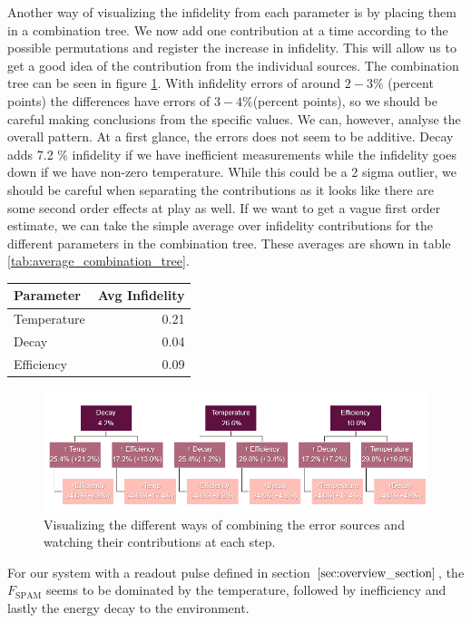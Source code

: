 Another way of visualizing the infidelity from each parameter is by placing them in a combination tree. We now add one contribution at a time according to the possible permutations and register the increase in infidelity. This will allow us to get a good idea of the contribution from the individual sources. The combination tree can be seen in figure \ref{fig:combination_tree_budget}. With infidelity errors of around $2-3\%$ (percent points) the differences have errors of $3-4 \%$(percent points), so we should be careful making conclusions from the specific values. We can, however, analyse the overall pattern. At a first glance, the errors does not seem to be additive. Decay adds 7.2 \% infidelity if we have inefficient measurements while the infidelity goes down if we have non-zero temperature. While this could be a 2 sigma outlier, we should be careful when separating the contributions as it looks like there are some second order effects at play as well. If we want to get a vague first order estimate, we can take the simple average over infidelity contributions for the different parameters in the combination tree. These averages are shown in table \ref{tab:average_combination_tree}. 
\begin{margintable}[-4 cm]
    \centering
    \caption{Average contribution to infidelity when counting in the combination tree seen in figure \ref{fig:combination_tree_budget}}
    \vspace{0.3 cm}
    \begin{tabular}{l|r}
    \hline
    Parameter       &  Avg Infidelity\\ \hline
    Temperature     & 0.21 \\
    Decay           & 0.04 \\
    Efficiency      & 0.09 \\
    \end{tabular}
    \label{tab:average_combination_tree}
\end{margintable}
\begin{figure}
    \centering
    \includegraphics{Figs/Results/combination_tree.png}
    \caption{Visualizing the different ways of combining the error sources and watching their contributions at each step.}
    \label{fig:combination_tree_budget}
\end{figure}
For our system with a readout pulse defined in section $\ref{sec:overview_section}$, the $F_{\text{SPAM}}$ seems to be dominated by the temperature, followed by inefficiency and lastly the energy decay to the environment. %




